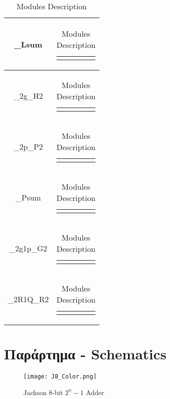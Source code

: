 \begin{appendices}
\begin{table}[H]
\begin{tabularx}{\textwidth}{ | c | X | }
    \_Lsum &
    \begin{tabular}{@{}c@{}}
        $sum = H\ ?\ x \oplus p\ :\ x$
    \end{tabular}\\\hline
    
    \_2g\_H2 &
    \begin{tabular}{@{}c@{}}
        $H = g_1 + g_0$
    \end{tabular}\\\hline
    
    \_2p\_P2 &
    \begin{tabular}{@{}c@{}}
        $P = p_1 p_0$
    \end{tabular}\\\hline
    
    \_Psum &
    \begin{tabular}{@{}c@{}}
        $sum = G \oplus x$
    \end{tabular}\\\hline
    
    \_2g1p\_G2 &
    \begin{tabular}{@{}c@{}}
        $G = g_1 + p*g_0$
    \end{tabular}\\\hline
    
    \_2R1Q\_R2 &
    \begin{tabular}{@{}c@{}}
        $R = R_1 + Q*R_0$
    \end{tabular}\\\hline
    
    
    \end{tabularx}
    \caption{Modules Description}
    \label{table:node_modules}
\end{table}

\section{Παράρτημα - Schematics}
\begin{figure}[H]
    \centering
    \texttt{[image: J8\_Color.png]}
    \caption{Jackson 8-bit $2^n-1$ Adder}
    \label{2^8-1_Tree_2x4}
\end{figure}

\end{appendices}